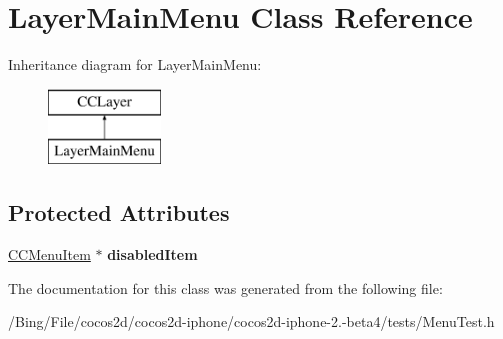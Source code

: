 \hypertarget{interface_layer_main_menu}{\section{Layer\-Main\-Menu Class Reference}
\label{interface_layer_main_menu}
}
Inheritance diagram for Layer\-Main\-Menu\-:\begin{figure}[H]
\begin{center}
\leavevmode
\includegraphics[height=2.000000cm]{interface_layer_main_menu}
\end{center}
\end{figure}
\subsection*{Protected Attributes}
\begin{DoxyCompactItemize}
\item 
\hypertarget{interface_layer_main_menu_aa96018313de10428192777a0e35e3e99}{\hyperlink{interface_c_c_menu_item}{C\-C\-Menu\-Item} $\ast$ {\bfseries disabled\-Item}}\label{interface_layer_main_menu_aa96018313de10428192777a0e35e3e99}

\end{DoxyCompactItemize}


The documentation for this class was generated from the following file\-:\begin{DoxyCompactItemize}
\item 
/\-Bing/\-File/cocos2d/cocos2d-\/iphone/cocos2d-\/iphone-\/2.-\/beta4/tests/Menu\-Test.\-h\end{DoxyCompactItemize}

